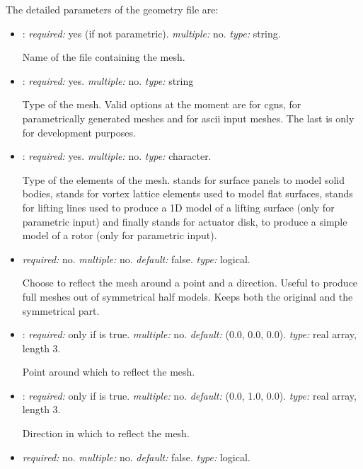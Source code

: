 The detailed parameters of the geometry file are:
\begin{itemize}
\item {}: \textit{required:} yes (if not parametric). \textit{multiple:} no. \textit{type:} string. 

Name of the file containing the mesh.

\item {}: \textit{required:} yes. \textit{multiple:} no. \textit{type:} string

Type of the mesh. Valid options at the moment are  for cgns,  for parametrically generated meshes and  for ascii input meshes. The last is only for development purposes. 

\item {}: \textit{required:} yes. \textit{multiple:} no. \textit{type:} character.

Type of the elements of the mesh.  stands for surface panels to model solid bodies,  stands for vortex lattice elements used to model flat surfaces,  stands for lifting lines used to produce a 1D model of a lifting surface (only for parametric input) and finally  stands for actuator disk, to produce a simple model of a rotor (only for parametric input). 

\item {} \textit{required:} no. \textit{multiple:} no. \textit{default:} false. \textit{type:} logical.

Choose to reflect the mesh around a point and a direction. Useful to produce full meshes out of symmetrical half models. Keeps both the original and the symmetrical part. 

\item {}: \textit{required:} only if  is true. \textit{multiple:} no. \textit{default:} (0.0, 0.0, 0.0). \textit{type:} real array, length 3.

Point around which to reflect the mesh.

\item {}: \textit{required:} only if  is true. \textit{multiple:} no. \textit{default:} (0.0, 1.0, 0.0). \textit{type:} real array, length 3.

Direction in which to reflect the mesh.

\item {} \textit{required:} no. \textit{multiple:} no. \textit{default:} false. \textit{type:} logical.


\end{itemize}
